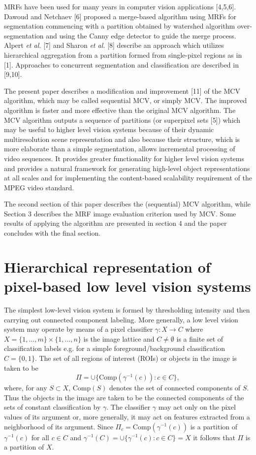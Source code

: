 \documentclass[12pt,twoside]{article}
\begin{document}
MRFs have
been used for many years in computer vision applications [4,5,6]. Dawoud and Netchaev [6]
proposed a merge-based algorithm using MRFs for segmentation commencing with a partition
obtained by watershed algorithm over-segmentation and using the Canny edge detector
to guide the merge process. Alpert {\em et al.} [7] and Sharon {\em et al.} [8] describe an approach which
utilizes hierarchical aggregation from a partition formed from single-pixel regions as in [1].
Approaches to concurrent segmentation and classification are described in [9,10].

The present paper describes a modification and improvement [11] of the MCV algorithm,
which may be called sequential MCV, or simply MCV. The improved algorithm is faster and
more effective than the original MCV algorithm.
The MCV algorithm outputs a sequence of partitions (or superpixel sets [5]) which may be
useful to higher level vision systems because of their dynamic multiresolution scene representation
and also because their structure, which is more elaborate than a simple segmentation,
allows incremental processing of video sequences. It provides greater functionality for higher level
vision systems and provides a natural framework for generating high-level object representations
at all scales and for implementing the content-based scalability requirement of the
MPEG video standard.

The second section of this paper describes the (sequential) MCV algorithm, while Section 3
describes the MRF image evaluation criterion used by MCV. Some results of applying the algorithm
are presented in section 4 and the paper concludes with the final section.

\section{Hierarchical representation of pixel-based low level vision systems}

The simplest low-level vision system is formed by thresholding intensity and then carrying
out connected component labeling. More generally, a low level vision system may operate by
means of a pixel classifier $\gamma : X \rightarrow C$ where $X = \{1, \ldots, m\} \times \{1, \ldots, n\}$ is the image lattice and $C
\neq \emptyset$ is a finite set of classification labels e.g. for a simple foreground/background classification
$C = \{0,1\}$. The set of all regions of interest
(ROIs) or objects in the image is taken to be
\begin{equation}
\Pi = \cup\{\mbox{Comp}(\gamma^{-1}(c)) : c\in C\},
\end{equation}
where, for any $S \subset X$, Comp$(S)$ denotes the set of connected components of $S$. Thus the objects
in the image are taken to be the connected components of the sets of constant classification by
$\gamma$. The classifier $\gamma$ may act only on the pixel values of its argument or, more generally, it may
act on features extracted from a neighborhood of its argument. Since $\Pi_c = \mbox{Comp}(\gamma^{-1}(c))$ is a
partition of $\gamma^{-1}(c)$ for all $c \in C$ and $\gamma^{-1}(C) = \cup\{\gamma^{-1}(c) : c \in C\} = X$ it follows that $\Pi$ is a partition of $X$.
\end{document}
